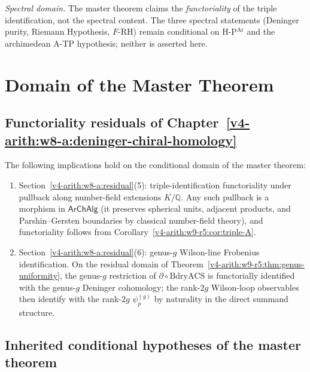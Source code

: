 \emph{Spectral domain.} The master theorem claims the
\emph{functoriality} of the triple identification, not the spectral
content. The three spectral statements (Deninger purity, Riemann
Hypothesis, \(F\)-RH) remain conditional on H-P\(^{\mathrm{Ar}}\) and
the archimedean A-TP hypothesis; neither is asserted here.

\section{Domain of the Master Theorem}
\label{v4-arith:w9-r5:residual-summary}

\subsection{Functoriality residuals of Chapter~\ref{v4-arith:w8-a:deninger-chiral-homology}}
\label{v4-arith:w9-r5:residual-closed}

The following implications hold on the conditional domain of the master
theorem:
\begin{enumerate}
\item Section~\ref{v4-arith:w8-a:residual}(5): triple-identification
functoriality under pullback along number-field extensions
\(K/\mathbb{Q}\). Any such pullback is a morphism in
\(\mathsf{ArChAlg}\) (it preserves spherical units, adjacent products,
and Parshin--Gersten boundaries by classical number-field theory),
and functoriality follows from
Corollary~\ref{v4-arith:w9-r5:cor:triple-A}.
\item Section~\ref{v4-arith:w8-a:residual}(6): genus-\(g\) Wilson-line
Frobenius identification. On the residual domain of
Theorem~\ref{v4-arith:w9-r5:thm:genus-uniformity}, the genus-\(g\)
restriction of \(\partial\circ\mathrm{BdryACS}\) is functorially
identified with the genus-\(g\) Deninger cohomology; the rank-\(2g\)
Wilson-loop observables then identify with the rank-\(2g\)
\(\psi_{p}^{(g)}\) by naturality in the direct summand structure.
\end{enumerate}

\subsection{Inherited conditional hypotheses of the master theorem}
\label{v4-arith:w9-r5:residual-inherited}


